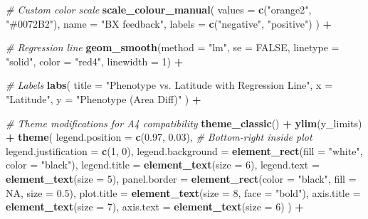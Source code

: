 \documentclass[
  11pt,
]{article}
\newenvironment{Shaded}{\begin{snugshade}}{\end{snugshade}}
\newcommand{\AttributeTok}[1]{\textcolor[rgb]{0.13,0.29,0.53}{#1}}
\newcommand{\CommentTok}[1]{\textcolor[rgb]{0.56,0.35,0.01}{\textit{#1}}}
\newcommand{\ConstantTok}[1]{\textcolor[rgb]{0.56,0.35,0.01}{#1}}
\newcommand{\DecValTok}[1]{\textcolor[rgb]{0.00,0.00,0.81}{#1}}
\newcommand{\FloatTok}[1]{\textcolor[rgb]{0.00,0.00,0.81}{#1}}
\newcommand{\FunctionTok}[1]{\textcolor[rgb]{0.13,0.29,0.53}{\textbf{#1}}}
\newcommand{\NormalTok}[1]{#1}
\newcommand{\SpecialCharTok}[1]{\textcolor[rgb]{0.81,0.36,0.00}{\textbf{#1}}}
\newcommand{\StringTok}[1]{\textcolor[rgb]{0.31,0.60,0.02}{#1}}
\begin{document}
\begin{Shaded}
\begin{Highlighting}[]
  \CommentTok{\# Custom color scale}
  \FunctionTok{scale\_colour\_manual}\NormalTok{(}
    \AttributeTok{values =} \FunctionTok{c}\NormalTok{(}\StringTok{"orange2"}\NormalTok{, }\StringTok{"\#0072B2"}\NormalTok{),}
    \AttributeTok{name =} \StringTok{"BX feedback"}\NormalTok{,}
    \AttributeTok{labels =} \FunctionTok{c}\NormalTok{(}\StringTok{"negative"}\NormalTok{, }\StringTok{"positive"}\NormalTok{)}
\NormalTok{  ) }\SpecialCharTok{+}
  
  \CommentTok{\# Regression line}
  \FunctionTok{geom\_smooth}\NormalTok{(}\AttributeTok{method =} \StringTok{"lm"}\NormalTok{, }\AttributeTok{se =} \ConstantTok{FALSE}\NormalTok{, }\AttributeTok{linetype =} \StringTok{"solid"}\NormalTok{, }
              \AttributeTok{color =} \StringTok{"red4"}\NormalTok{, }\AttributeTok{linewidth =} \DecValTok{1}\NormalTok{) }\SpecialCharTok{+}
  
  \CommentTok{\# Labels}
  \FunctionTok{labs}\NormalTok{(}
    \AttributeTok{title =} \StringTok{"Phenotype vs. Latitude with Regression Line"}\NormalTok{,}
    \AttributeTok{x =} \StringTok{"Latitude"}\NormalTok{,}
    \AttributeTok{y =} \StringTok{"Phenotype (Area Diff)"}
\NormalTok{  ) }\SpecialCharTok{+}
  
  \CommentTok{\# Theme modifications for A4 compatibility}
  \FunctionTok{theme\_classic}\NormalTok{() }\SpecialCharTok{+}
  \FunctionTok{ylim}\NormalTok{(y\_limits) }\SpecialCharTok{+}
  \FunctionTok{theme}\NormalTok{(}
    \AttributeTok{legend.position =} \FunctionTok{c}\NormalTok{(}\FloatTok{0.97}\NormalTok{, }\FloatTok{0.03}\NormalTok{),  }\CommentTok{\# Bottom{-}right inside plot}
    \AttributeTok{legend.justification =} \FunctionTok{c}\NormalTok{(}\DecValTok{1}\NormalTok{, }\DecValTok{0}\NormalTok{),  }
    \AttributeTok{legend.background =} \FunctionTok{element\_rect}\NormalTok{(}\AttributeTok{fill =} \StringTok{"white"}\NormalTok{, }\AttributeTok{color =} \StringTok{"black"}\NormalTok{),}
    \AttributeTok{legend.title =} \FunctionTok{element\_text}\NormalTok{(}\AttributeTok{size =} \DecValTok{6}\NormalTok{),}
    \AttributeTok{legend.text =} \FunctionTok{element\_text}\NormalTok{(}\AttributeTok{size =} \DecValTok{5}\NormalTok{),}
    \AttributeTok{panel.border =} \FunctionTok{element\_rect}\NormalTok{(}\AttributeTok{color =} \StringTok{"black"}\NormalTok{, }\AttributeTok{fill =} \ConstantTok{NA}\NormalTok{, }\AttributeTok{size =} \FloatTok{0.5}\NormalTok{),}
    \AttributeTok{plot.title =} \FunctionTok{element\_text}\NormalTok{(}\AttributeTok{size =} \DecValTok{8}\NormalTok{, }\AttributeTok{face =} \StringTok{"bold"}\NormalTok{),}
    \AttributeTok{axis.title =} \FunctionTok{element\_text}\NormalTok{(}\AttributeTok{size =} \DecValTok{7}\NormalTok{),}
    \AttributeTok{axis.text =} \FunctionTok{element\_text}\NormalTok{(}\AttributeTok{size =} \DecValTok{6}\NormalTok{)}
\NormalTok{  ) }\SpecialCharTok{+}
  

\end{Highlighting}
\end{Shaded}
\end{document}
